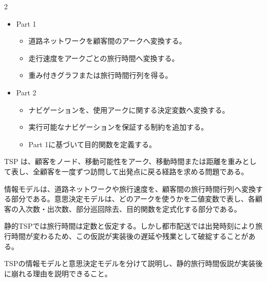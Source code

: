 \clearpage



\vspace{1.5mm}

\begin{multicols}{2}

\footnotesize

\raggedcolumns


\begin{itemize}
\item Part 1
\begin{itemize}
\item 道路ネットワークを顧客間のアークへ変換する。
\item 走行速度をアークごとの旅行時間へ変換する。
\item 重み付きグラフまたは旅行時間行列を得る。
\end{itemize}
\item Part 2
\begin{itemize}
\item ナビゲーションを、使用アークに関する決定変数へ変換する。
\item 実行可能なナビゲーションを保証する制約を追加する。
\item Part 1に基づいて目的関数を定義する。
\end{itemize}
\end{itemize}

TSP は、顧客をノード、移動可能性をアーク、移動時間または距離を重みとして表し、全顧客を一度ずつ訪問して出発点に戻る経路を求める問題である。\par

情報モデルは、道路ネットワークや旅行速度を、顧客間の旅行時間行列へ変換する部分である。意思決定モデルは、どのアークを使うかを二値変数で表し、各顧客の入次数・出次数、部分巡回除去、目的関数を定式化する部分である。\par

静的TSPでは旅行時間は定数と仮定する。しかし都市配送では出発時刻により旅行時間が変わるため、この仮説が実装後の遅延や残業として破綻することがある。\par

TSPの情報モデルと意思決定モデルを分けて説明し、静的旅行時間仮説が実装後に崩れる理由を説明できること。\par


\end{multicols}
